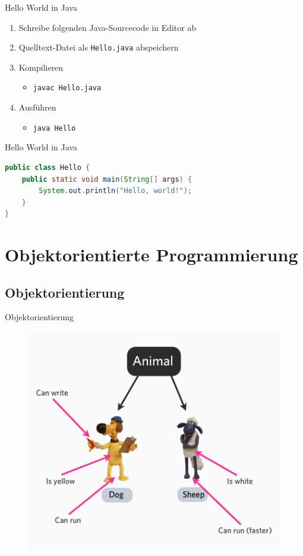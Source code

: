 \documentclass[18pt]{beamer}
\begin{document}
\begin{frame}{Hello World in Java}
    \begin{enumerate}
        \item Schreibe folgenden Java-Sourcecode in Editor ab
        \item Quelltext-Datei als \texttt{Hello.java} abspeichern
        \item Kompilieren
            \begin{itemize}
                \item \texttt{javac Hello.java}
            \end{itemize}
        \item Ausführen
        \begin{itemize}
            \item \texttt{java Hello}
        \end{itemize}
    \end{enumerate}
\end{frame}

\begin{frame}[fragile]{Hello World in Java}
    \begin{lstlisting}[language=Java]
public class Hello {
    public static void main(String[] args) {
        System.out.println("Hello, world!");
    }
}
    \end{lstlisting}
\end{frame}

\section{Objektorientierte Programmierung}

\subsection{Objektorientierung}

\begin{frame}{Objektorientierung}
    \begin{figure}
        \includegraphics[scale=0.4]{img/animalclass.png}
    \end{figure}
\end{frame}
\end{document}
